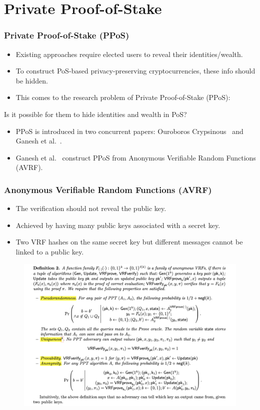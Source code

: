 \documentclass{beamer}
\begin{document}
\section{Private Proof-of-Stake}

\begin{frame}
\frametitle{Private Proof-of-Stake (PPoS)}

\begin{itemize}
    \item Existing approaches require elected users to reveal their identities/wealth.
    \item To construct PoS-based privacy-preserving cryptocurrencies, these info should be hidden.
    \item This comes to the research problem of Private Proof-of-Stake (PPoS):
\end{itemize}

\centerline{\color{red} Is it possible for them to hide identities and wealth in PoS?}

\begin{itemize}
    \item PPoS is introduced in two concurrent papers: Ouroboros Crypsinous~\cite{kerber2019ouroboros} and Ganesh et al.~\cite{ganesh2019proof}.
    \item Ganesh et al.~\cite{ganesh2019proof} construct PPoS from Anonymous Verifiable Random Functions (AVRF).
\end{itemize}

\end{frame}


\begin{frame}
\frametitle{Anonymous Verifiable Random Functions (AVRF)}
    
\begin{itemize}
    \item The verification should not reveal the public key.
    \item Achieved by having many public keys associated with a secret key.
    \item Two VRF hashes on the same secret key but different messages cannot be linked to a public key.
\end{itemize}

\begin{figure}
    \centering
    \includegraphics[width=.7\textwidth]{figs/avrf-def.png}
\end{figure}


\end{frame}
\end{document}
